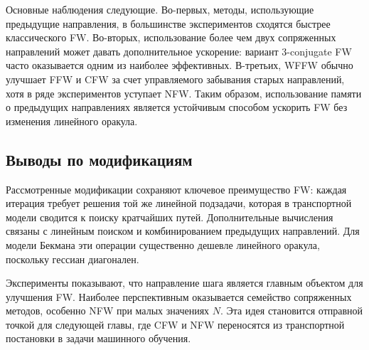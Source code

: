 Основные наблюдения следующие.
Во-первых, методы, использующие предыдущие направления, в большинстве экспериментов сходятся
быстрее классического FW.
Во-вторых, использование более чем двух сопряженных направлений может давать дополнительное
ускорение: вариант $3$-conjugate FW часто оказывается одним из наиболее эффективных.
В-третьих, WFFW обычно улучшает FFW и CFW за счет управляемого забывания старых направлений,
хотя в ряде экспериментов уступает NFW.
Таким образом, использование памяти о предыдущих направлениях является устойчивым способом
ускорить FW без изменения линейного оракула.



\subsection{Выводы по модификациям}

Рассмотренные модификации сохраняют ключевое преимущество FW: каждая итерация требует решения той же линейной подзадачи, которая в транспортной модели сводится к поиску кратчайших путей.
Дополнительные вычисления связаны с линейным поиском и комбинированием предыдущих направлений.
Для модели Бекмана эти операции существенно дешевле линейного оракула, поскольку гессиан диагонален.

Эксперименты показывают, что направление шага является главным объектом для улучшения FW.
Наиболее перспективным оказывается семейство сопряженных методов, особенно NFW при малых значениях $N$.
Эта идея становится отправной точкой для следующей главы, где CFW и NFW переносятся из транспортной постановки в задачи машинного обучения.

